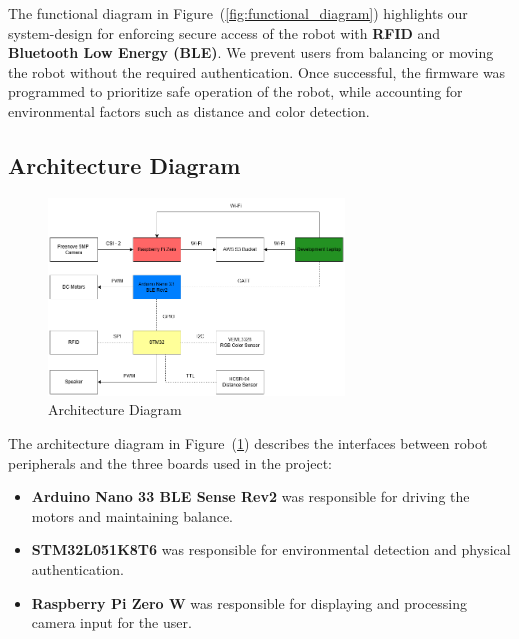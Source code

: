 \documentclass{article}
\begin{document}
\begin{minipage}{\linewidth}
    The functional diagram in Figure~(\ref{fig:functional_diagram}) highlights our system-design for enforcing secure access of the robot with
    \textbf{RFID} and \textbf{Bluetooth Low Energy (BLE)}. We prevent users from balancing or moving the robot without the required authentication. Once successful,
    the firmware was programmed to prioritize safe operation of the robot, while accounting for environmental factors such as distance and color detection. \\
\end{minipage}

\subsection{Architecture Diagram}

\begin{figure}[H]
    \centering
    \includegraphics[width=0.7\textwidth]{Figures/Architecture_Diagram.png}
    \caption{Architecture Diagram}
    \label{fig:architecture_diagram}
\end{figure}

\begin{minipage}{\linewidth}
    The architecture diagram in Figure~(\ref{fig:architecture_diagram}) describes the interfaces between robot peripherals and the three boards
    used in the project: \\
\end{minipage}

\begin{itemize}
    \item \textbf{Arduino Nano 33 BLE Sense Rev2} was responsible for driving the motors and maintaining balance.
    \item \textbf{STM32L051K8T6} was responsible for environmental detection and physical authentication.
    \item \textbf{Raspberry Pi Zero W} was responsible for displaying and processing camera input for the user.
\end{itemize}
\end{document}

